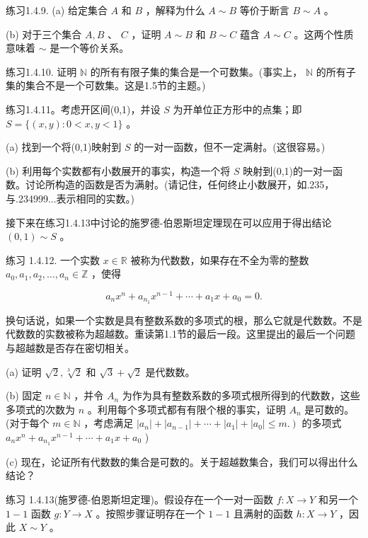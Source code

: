 练习1.4.9. (a) 给定集合 \(A\) 和 \(B\) ，解释为什么 \(A \sim  B\) 等价于断言 \(B \sim  A\) 。

(b) 对于三个集合 \(A,B\) 、 \(C\) ，证明 \(A \sim  B\) 和 \(B \sim  C\) 蕴含 \(A \sim  C\) 。这两个性质意味着 \(\sim\) 是一个等价关系。

练习1.4.10. 证明 \(\mathbb{N}\) 的所有有限子集的集合是一个可数集。(事实上， \(\mathbb{N}\) 的所有子集的集合不是一个可数集。这是1.5节的主题。)

练习1.4.11。考虑开区间(0,1)，并设 \(S\) 为开单位正方形中的点集；即 \(S = \{ \left( {x,y}\right)  : 0 < x,y < 1\}\) 。

(a) 找到一个将(0,1)映射到 \(S\) 的一对一函数，但不一定满射。(这很容易。)

(b) 利用每个实数都有小数展开的事实，构造一个将 \(S\) 映射到(0,1)的一对一函数。讨论所构造的函数是否为满射。(请记住，任何终止小数展开，如.235，与.234999...表示相同的实数。)

接下来在练习1.4.13中讨论的施罗德-伯恩斯坦定理现在可以应用于得出结论 \(\left( {0,1}\right)  \sim  S\) 。

练习 1.4.12. 一个实数 \(x \in  \mathbb{R}\) 被称为代数数，如果存在不全为零的整数 \({a}_{0},{a}_{1},{a}_{2},\ldots ,{a}_{n} \in  \mathbb{Z}\) ，使得

\[
{a}_{n}{x}^{n} + {a}_{{n}_{1}}{x}^{n - 1} + \cdots  + {a}_{1}x + {a}_{0} = 0.
\]

换句话说，如果一个实数是具有整数系数的多项式的根，那么它就是代数数。不是代数数的实数被称为超越数。重读第1.1节的最后一段。这里提出的最后一个问题与超越数是否存在密切相关。

(a) 证明 \(\sqrt{2},\sqrt[3]{2}\) 和 \(\sqrt{3} + \sqrt{2}\) 是代数数。

(b) 固定 \(n \in  \mathbb{N}\) ，并令 \({A}_{n}\) 为作为具有整数系数的多项式根所得到的代数数，这些多项式的次数为 \(n\) 。利用每个多项式都有有限个根的事实，证明 \({A}_{n}\) 是可数的。(对于每个 \(m \in  \mathbb{N}\) ，考虑满足 \(\left. {\left| {a}_{n}\right|  + \left| {a}_{n - 1}\right|  + \cdots  + \left| {a}_{1}\right|  + \left| {a}_{0}\right|  \leq  m.}\right)\) 的多项式 \({a}_{n}{x}^{n} + {a}_{{n}_{1}}{x}^{n - 1} + \cdots  + {a}_{1}x + {a}_{0}\) )

(c) 现在，论证所有代数数的集合是可数的。关于超越数集合，我们可以得出什么结论？

练习 1.4.13(施罗德-伯恩斯坦定理)。假设存在一个一对一函数 \(f : X \rightarrow  Y\) 和另一个 \(1 - 1\) 函数 \(g : Y \rightarrow  X\) 。按照步骤证明存在一个 \(1 - 1\) 且满射的函数 \(h : X \rightarrow  Y\) ，因此 \(X \sim  Y\) 。

